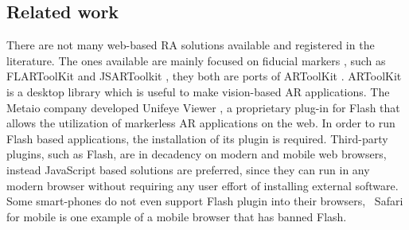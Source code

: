 \subsection{Related work} %
\label{sub:tracking_library_for_the_web:related_work}

There are not many web-based RA solutions available and registered in the literature. The ones available are mainly focused on fiducial markers \cite{Cho1998}, such as FLARToolKit \cite{Yan2011} and JSARToolkit \cite{JSARToolkit2011}, they both are ports of ARToolKit \cite{Hirokazu2002}. ARToolKit is a desktop library which is useful to make vision-based AR applications. The Metaio company developed Unifeye Viewer \cite{Metaio2009}, a proprietary plug-in for Flash \cite{Flash2013} that allows the utilization of markerless AR applications on the web. In order to run Flash based applications, the installation of its plugin is required. Third-party plugins, such as Flash, are in decadency on modern and mobile web browsers, instead JavaScript based solutions are preferred, since they can run in any modern browser without requiring any user effort of installing external software. Some smart-phones do not even support Flash plugin into their browsers, \eg\ Safari for mobile \cite{Safari2013} is one example of a mobile browser that has banned Flash.

